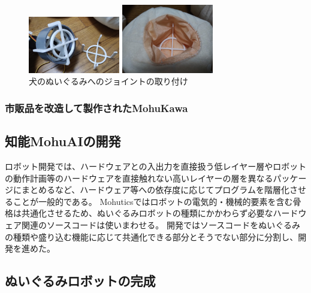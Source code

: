 \documentclass[uplatex,a4paper,12pt]{jsarticle}
\begin{document}
\begin{figure}[htbp]
  \centering
  \begin{minipage}[c]{0.48\linewidth}
    \centering
    \includegraphics[keepaspectratio,width=4cm,clip]{images/mohukawa/joint_01.jpg}
  \end{minipage}
  \begin{minipage}[c]{0.48\linewidth}
    \centering
    \includegraphics[keepaspectratio,width=4cm,clip]{images/mohukawa/joint_02.jpg}
  \end{minipage}
  \caption{犬のぬいぐるみへのジョイントの取り付け}
  \label{fig:mohukawa:joint}
\end{figure}


\subsubsection{市販品を改造して製作されたMohuKawa}


\subsection{知能MohuAIの開発}

ロボット開発では、ハードウェアとの入出力を直接扱う低レイヤー層やロボットの動作計画等のハードウェアを直接触れない高いレイヤーの層を異なるパッケージにまとめるなど、ハードウェア等への依存度に応じてプログラムを階層化させることが一般的である。
Mohuticsではロボットの電気的・機械的要素を含む骨格は共通化させるため、ぬいぐるみロボットの種類にかかわらず必要なハードウェア関連のソースコードは使いまわせる。
開発ではソースコードをぬいぐるみの種類や盛り込む機能に応じて共通化できる部分とそうでない部分に分割し、開発を進めた。

\subsection{ぬいぐるみロボットの完成}
\end{document}
